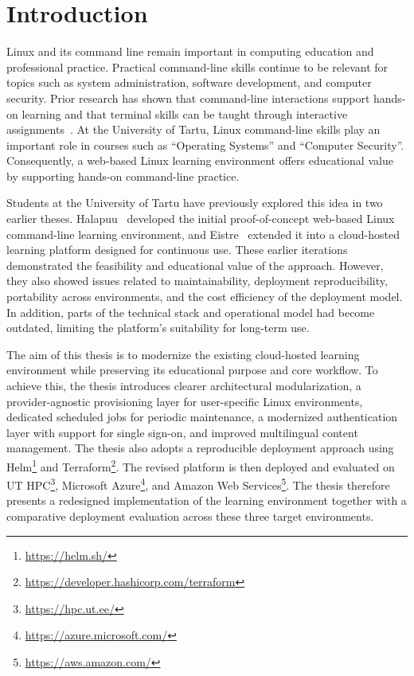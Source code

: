 \section{Introduction} \label{sec:introduction}
Linux and its command line remain important in computing education and professional practice.
Practical command-line skills continue to be relevant for topics such as system administration, software development, and computer security.
Prior research has shown that command-line interactions support hands-on learning and that terminal skills can be taught through interactive assignments~\cite{svabensky_toolset_2021,bailey_uassign_2019}.
At the University of Tartu, Linux command-line skills play an important role in courses such as ``Operating Systems'' and ``Computer Security''.
Consequently, a web-based Linux learning environment offers educational value by supporting hands-on command-line practice.

Students at the University of Tartu have previously explored this idea in two earlier theses.
Halapuu~\cite{halapuu_2022} developed the initial proof-of-concept web-based Linux command-line learning environment, and Eistre~\cite{eistre_2024} extended it into a cloud-hosted learning platform designed for continuous use.
These earlier iterations demonstrated the feasibility and educational value of the approach.
However, they also showed issues related to maintainability, deployment reproducibility, portability across environments, and the cost efficiency of the deployment model.
In addition, parts of the technical stack and operational model had become outdated, limiting the platform's suitability for long-term use.

The aim of this thesis is to modernize the existing cloud-hosted learning environment while preserving its educational purpose and core workflow.
To achieve this, the thesis introduces clearer architectural modularization, a provider-agnostic provisioning layer for user-specific Linux environments, dedicated scheduled jobs for periodic maintenance, a modernized authentication layer with support for single sign-on, and improved multilingual content management.
The thesis also adopts a reproducible deployment approach using Helm\footnote{\url{https://helm.sh/}} and Terraform\footnote{\url{https://developer.hashicorp.com/terraform}}.
The revised platform is then deployed and evaluated on UT HPC\footnote{\url{https://hpc.ut.ee/}}, Microsoft Azure\footnote{\url{https://azure.microsoft.com/}}, and Amazon Web Services\footnote{\url{https://aws.amazon.com/}}.
The thesis therefore presents a redesigned implementation of the learning environment together with a comparative deployment evaluation across these three target environments.


